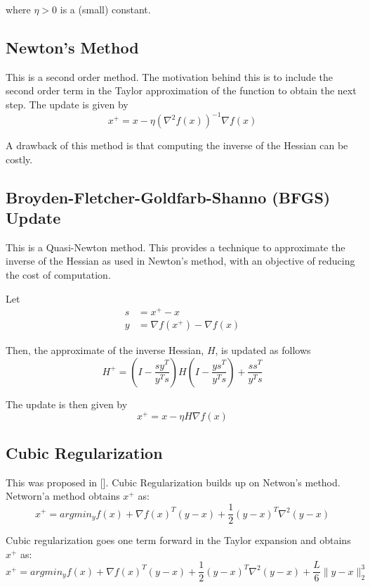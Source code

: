 \documentclass{article}
\begin{document}
where $\eta > 0$ is a (small) constant.

\subsection{Newton's Method}
This is a second order method. The motivation behind this is to include the second order term in the Taylor approximation of the function to obtain the next step. The update is given by
\begin{equation}
x^+ = x - \eta \left(\nabla^2 f(x) \right)^{-1}\nabla f(x)
\end{equation}

A drawback of this method is that computing the inverse of the Hessian can be costly.

\subsection{Broyden-Fletcher-Goldfarb-Shanno (BFGS) Update}
This is a Quasi-Newton method. This provides a technique to approximate the inverse of the Hessian as used in Newton's method, with an objective of reducing the cost of computation.

Let
\begin{align}
s &= x^+ - x \\
y &= \nabla f(x^+) - \nabla f(x)
\end{align}

Then, the approximate of the inverse Hessian, $H$, is updated as follows
\begin{equation}
H^+ = \left(I - \frac{sy^T}{y^Ts}\right)H\left(I-\frac{ys^T}{y^Ts}\right)+\frac{ss^T}{y^Ts}
\end{equation}

The update is then given by
\begin{equation}
x^+ = x - \eta H \nabla f(x)
\end{equation}

\subsection{Cubic Regularization}
This was proposed in []. Cubic Regularization builds up on Netwon's method. Networn'a method obtains $x^+$ as:
\begin{equation}
	x^+ = argmin_y f(x) + \nabla f(x)^T (y-x) + \frac12 (y-x)^T \nabla^2 (y-x)
\end{equation}

Cubic regularization goes one term forward in the Taylor expansion and obtains $x^+$ as:
\begin{equation}
x^+ = argmin_y f(x) + \nabla f(x)^T (y-x) + \frac12 (y-x)^T \nabla^2 (y-x) + \frac{L}{6}\lVert y-x \rVert_2^3
\end{equation}
\end{document}
